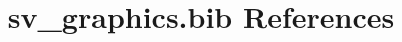 \documentclass[12pt]{article}
\begin{document}
\nocite{*}
\title{sv\_graphics.bib References}
\maketitle
%



\end{document}
